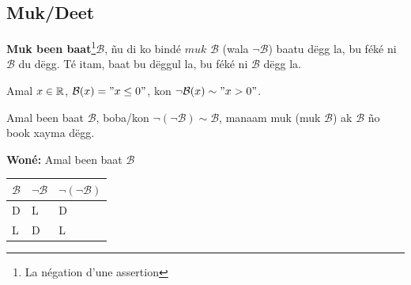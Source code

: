 \documentclass[twoside, a4paper]{article}
\begin{document}
\subsection{Muk/Deet}
\begin{tcolorbox}[enhanced jigsaw,breakable,pad at break*=1mm, colback=red!5!white,colframe=white!75!black,title= Téeki,
    watermark color=white]
  \textbf{Muk been baat}\footnote{La négation d'une assertion}$\mathcal{B}$, ñu di ko bindé $\textit{muk } \mathcal{B}$ (wala $\neg  \mathcal{B}$) baatu dëgg la, bu féké ni $\mathcal{B}$ du dëgg. Té itam, baat bu dëggul la, bu féké ni $\mathcal{B}$ dëgg la.
\end{tcolorbox}
Amal $x \in \mathbb{R}$, $\mathcal{B}(x) = " x \leq 0"$, kon $\neg \mathcal{B}(x) \sim "x > 0"$.

\begin{tcolorbox}[enhanced jigsaw,breakable,pad at break*=1mm, colback=blue!5!white,colframe=white!75!black,title= Tèg\footnote{Proposition},
    watermark color=white]
  Amal been baat $\mathcal{B}$, boba/kon $\neg (\neg \mathcal{B}) \sim \mathcal{B}$, manaam muk (muk $\mathcal{B}$) ak $\mathcal{B}$ ño book xayma dëgg.
\end{tcolorbox}

\textbf{Woné:}
\vspace{0.3cm}
Amal been baat $\mathcal{B}$ \newline
\vspace{0.3cm}
\begin{tabularx}{0.8\textwidth} {
    | >{\centering\arraybackslash}X
    | >{\centering\arraybackslash}X
    | >{\centering\arraybackslash}X |}
  \hline
  $\mathcal{B}$ & $\neg\mathcal{B}$ & $\neg(\neg\mathcal{B})$ \\
  \hline
  D             & L                 & D                       \\
  L             & D                 & L                       \\
  \hline
\end{tabularx}
\end{document}
